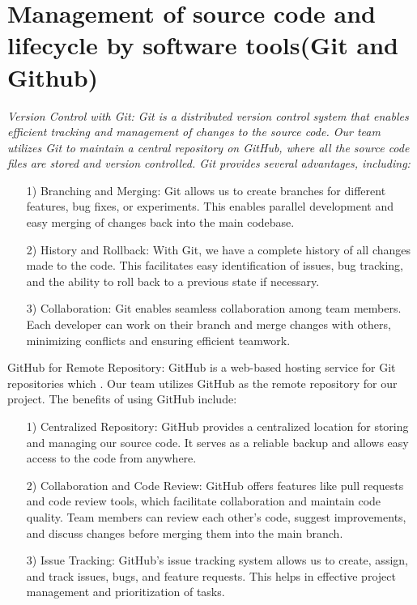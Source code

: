 {	\section{Management of source code and lifecycle by software tools(Git and Github)}
	{\slshape \selectfont 
		Version Control with Git:
		Git is a distributed version control system that enables efficient tracking and management of changes to the source code. Our team utilizes Git to maintain a central repository on GitHub, where all the source code files are stored and version controlled. 
		Git provides several advantages, including:\\
			\begin{itemize}
			\item [1)]
			Branching and Merging: Git allows us to create branches for different features, bug fixes, or experiments. This enables parallel development and easy merging of changes back into the main codebase.
			\item [2)]
			History and Rollback: With Git, we have a complete history of all changes made to the code. This facilitates easy identification of issues, bug tracking, and the ability to roll back to a previous state if necessary.
			\item [3)]
			Collaboration: Git enables seamless collaboration among team members. Each developer can work on their branch and merge changes with others, minimizing conflicts and ensuring efficient teamwork.
			\end{itemize}
			GitHub for Remote Repository:
			GitHub is a web-based hosting service for Git repositories which . Our team utilizes GitHub as the remote repository for our project. The benefits of using GitHub include:\\
			\begin{itemize}
			\item [1)]
			Centralized Repository: GitHub provides a centralized location for storing and managing our source code. It serves as a reliable backup and allows easy access to the code from anywhere.
			\item [2)]
			Collaboration and Code Review: GitHub offers features like pull requests and code review tools, which facilitate collaboration and maintain code quality. Team members can review each other's code, suggest improvements, and discuss changes before merging them into the main branch.
			\item [3)]		
			Issue Tracking: GitHub's issue tracking system allows us to create, assign, and track issues, bugs, and feature requests. This helps in effective project management and prioritization of tasks.
		\end{itemize}
	}
	\newpage
}
